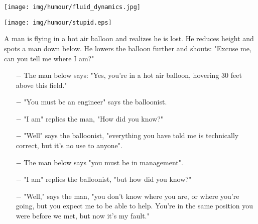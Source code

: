 \begin{center}\underline{\hspace{5 cm}}\end{center}
	\begin{center}
	\texttt{[image: img/humour/fluid\_dynamics.jpg]}
	\end{center}

	\begin{center}
	\texttt{[image: img/humour/stupid.eps]}
	\end{center}
\begin{center}\underline{\hspace{5 cm}}\end{center}

A man is flying in a hot air balloon and realizes he is lost. He reduces height and spots a man down below. He lowers the balloon further and shouts: "Excuse me, can you tell me where I am?" 
\begin{itemize}
	\item[$-$] The man below says: "Yes, you're in a hot air balloon, hovering 30 feet above this field." 

	\item[$-$] "You must be an engineer" says the balloonist. 

	\item[$-$] "I am" replies the man, "How did you know?" 

	\item[$-$] "Well" says the balloonist, "everything you have told me is technically correct, but it's no use to anyone". 

	\item[$-$] The man below says "you must be in management". 

	\item[$-$] "I am" replies the balloonist, "but how did you know?" 

	\item[$-$] "Well," says the man, "you don't know where you are, or where you're going, but you expect me to be able to help. You're in the same position you were before we met, but now it's my fault." 
\end{itemize}
\begin{center}\underline{\hspace{5 cm}}\end{center}

